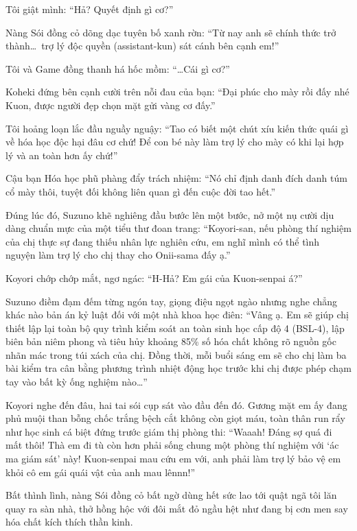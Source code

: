 \documentclass[../main.tex]{subfiles}
\begin{document}
Tôi giật mình: ``Hả? Quyết định gì cơ?''

Nàng Sói đồng cỏ dõng dạc tuyên bố xanh rờn: ``Từ nay anh sẽ chính thức trở thành\dots\ trợ lý độc quyền (assistant-kun) sát cánh bên cạnh em!''

Tôi và Game đồng thanh há hốc mồm: ``\dots Cái gì cơ?''

Koheki đứng bên cạnh cười trên nỗi đau của bạn: ``Đại phúc cho mày rồi đấy nhé Kuon, được người đẹp chọn mặt gửi vàng cơ đấy.''

Tôi hoảng loạn lắc đầu nguầy nguậy: ``Tao có biết một chút xíu kiến thức quái gì về hóa học độc hại đâu cơ chứ! Để con bé này làm trợ lý cho mày có khi lại hợp lý và an toàn hơn ấy chứ!''

Cậu bạn Hóa học phũ phàng đẩy trách nhiệm: ``Nó chỉ định danh đích danh túm cổ mày thôi, tuyệt đối không liên quan gì đến cuộc đời tao hết.''

Đúng lúc đó, Suzuno khẽ nghiêng đầu bước lên một bước, nở một nụ cười dịu dàng chuẩn mực của một tiểu thư đoan trang: ``Koyori-san, nếu phòng thí nghiệm của chị thực sự đang thiếu nhân lực nghiên cứu, em nghĩ mình có thể tình nguyện làm trợ lý cho chị thay cho Onii-sama đấy ạ.''

Koyori chớp chớp mắt, ngơ ngác: ``H-Hả? Em gái của Kuon-senpai á?''

Suzuno điềm đạm đếm từng ngón tay, giọng điệu ngọt ngào nhưng nghe chẳng khác nào bản án kỷ luật đối với một nhà khoa học điên: ``Vâng ạ. Em sẽ giúp chị thiết lập lại toàn bộ quy trình kiểm soát an toàn sinh học cấp độ 4 (BSL-4), lập biên bản niêm phong và tiêu hủy khoảng 85\% số hóa chất không rõ nguồn gốc nhãn mác trong túi xách của chị. Đồng thời, mỗi buổi sáng em sẽ cho chị làm ba bài kiểm tra cân bằng phương trình nhiệt động học trước khi chị được phép chạm tay vào bất kỳ ống nghiệm nào\dots''

Koyori nghe đến đâu, hai tai sói cụp sát vào đầu đến đó. Gương mặt em ấy đang phủ muội than bỗng chốc trắng bệch cắt không còn giọt máu, toàn thân run rẩy như học sinh cá biệt đứng trước giám thị phòng thi: ``Waaah! Đáng sợ quá đi mất thôi! Thà em đi tù còn hơn phải sống chung một phòng thí nghiệm với `ác ma giám sát' này! Kuon-senpai mau cứu em với, anh phải làm trợ lý bảo vệ em khỏi cô em gái quái vật của anh mau lênnn!''

Bất thình lình, nàng Sói đồng cỏ bất ngờ dùng hết sức lao tới quật ngã tôi lăn quay ra sàn nhà, thở hồng hộc với đôi mắt đỏ ngầu hệt như đang bị cơn men say hóa chất kích thích thần kinh.
\end{document}
